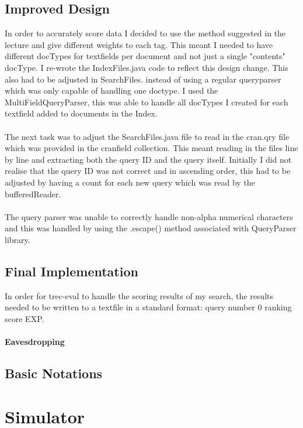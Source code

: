 \subsection{Improved Design}
In order to accurately score data I decided to use the method suggested in the lecture and give different weights to each tag. This meant I needed to have different docTypes for textfields per document and not just a single "contents" docType. I re-wrote the IndexFiles.java code to reflect this design change. This also had to be adjusted in SearchFiles. instead of using a regular queryparser which was only capable of handling one doctype. I used the MultiFieldQueryParser, this was able to handle all docTypes I created for each textfield added to documents in the Index.
\\\\
The next task was to adjust the SearchFiles.java file to read in the cran.qry file which was provided in the cranfield collection. This meant reading in the files line by line and extracting both the query ID and the query itself. Initially I did not realise that the query ID was not correct and in ascending order, this had to be adjusted by having a count for each new query which was read by the bufferedReader.
\\\\
The query parser was unable to correctly handle non-alpha numerical characters and this was handled by using the .escape() method associated with QueryParser library.

\subsection{Final Implementation}
In order for trec-eval to handle the scoring results of my search, the results needed to be written to a textfile in a standard format: {query number} 0 {ranking} {score} EXP.


\paragraph{Eavesdropping}

\subsection{Basic Notations}



\section{Simulator}


